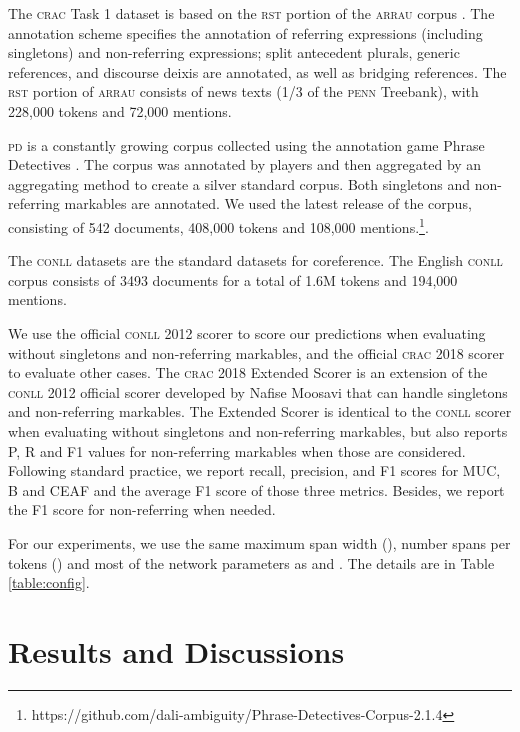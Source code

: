 \documentclass[10pt, a4paper]{article}
\newcommand{\ACRO}[1]{\textsc{#1}}
\newcommand{\ARRAU}{\ACRO{arrau}}
\newcommand{\CONLL}{\ACRO{conll}}
\newcommand{\CRAC}{\ACRO{crac}}
\newcommand{\PD}{\ACRO{pd}}
\newcommand{\pdfull}{Phrase Detectives}
\begin{document}
The {\CRAC} Task 1 dataset is based on the \ACRO{rst} portion of the {\ARRAU} corpus \cite{uryupina-et-al:NLEJ}.
The annotation scheme specifies the annotation of referring expressions (including singletons) and non-referring expressions; split antecedent plurals, generic references, and discourse deixis are annotated, as well as bridging references. The \ACRO{rst} portion of {\ARRAU} consists of news texts (1/3 of the \ACRO{penn} Treebank), 
with 228,000 tokens and 72,000 mentions.

{\PD} is a constantly growing corpus collected using the annotation game {\pdfull} \cite{poesio-etal-2019-crowdsourced}. The corpus was annotated by players and then aggregated by an aggregating method to create a silver standard corpus. 
Both singletons and non-referring markables are annotated. 
We used the latest release of the corpus, consisting  of 542 documents, 408,000 tokens and 108,000 mentions.\footnote{https://github.com/dali-ambiguity/Phrase-Detectives-Corpus-2.1.4}.

The {\CONLL} datasets are the standard datasets 
for coreference. 
The English {\CONLL} corpus consists of 
3493 documents 
for a total of 1.6M tokens and 194,000 mentions. 

We use the official {\CONLL} 2012 scorer to score our predictions when evaluating without singletons and non-referring markables, 
and the official {\CRAC} 2018 scorer \cite{poesio2018crac} to evaluate other cases. 
The {\CRAC} 2018 Extended Scorer is an extension of the {\CONLL} 2012 official scorer developed by Nafise Moosavi that can handle singletons and non-referring markables. 
The Extended Scorer is identical to the {\CONLL} scorer when evaluating without singletons and non-referring markables, but also reports P, R and F1 values for non-referring markables when those are considered. 
Following standard practice, we report recall, precision, and F1 scores for MUC, B and CEAF and the average F1 score of those three metrics. Besides, we report the F1 score for non-referring when needed.

For our experiments, we use the same maximum span width (), number spans per tokens () and most of the network parameters as  and . 
The details are in Table \ref{table:config}.



\section{Results and Discussions}
\label{sec:results}
\end{document}
